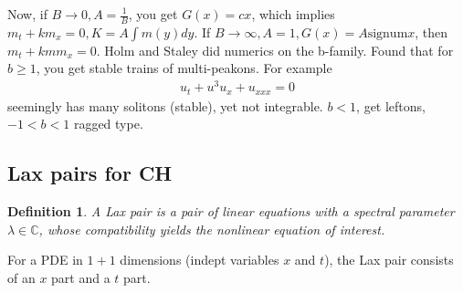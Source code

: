 \documentclass[12pt,reqno]{amsart}
\numberwithin{equation}{section}  %
\newcommand{\cc}{\mathbb{C}}
\newtheorem{definition}[theorem]{Definition}
\begin{document}
%
%
  Now, if $B \to 0, A = \frac{1}{B}$, you get $G(x) = cx$, which implies
  $m_{t} + k m_{x} = 0, K = A \int m(y) dy$. If $B \to \infty, A=1, G(x) = A
  \text{signum} x$, then $m_{t} + kmm_{x}=0$. Holm and Staley did numerics on the
  b-family. Found that for $b \ge 1$, you get stable trains of multi-peakons. For
  example
%
%
  \begin{equation*}
    \begin{split}
      u_{t} + u^{3} u_{x} + u_{xxx} = 0
    \end{split}
  \end{equation*}
%
%
  seemingly has many solitons (stable), yet not integrable. $b < 1$, get leftons,
  $-1 < b < 1$ ragged type.
  \subsection{Lax pairs for CH} 
  \label{ssec:lax-pair-CH}
  \begin{definition}
    A Lax pair is a pair of linear equations with a spectral parameter $\lambda \in
    \cc$, whose compatibility yields the nonlinear equation of interest. 
  \end{definition}
  For a PDE in $1+1$ dimensions (indept variables $x$ and $t$), the Lax pair
  consists of an $x$ part and a $t$ part.
\end{document}
